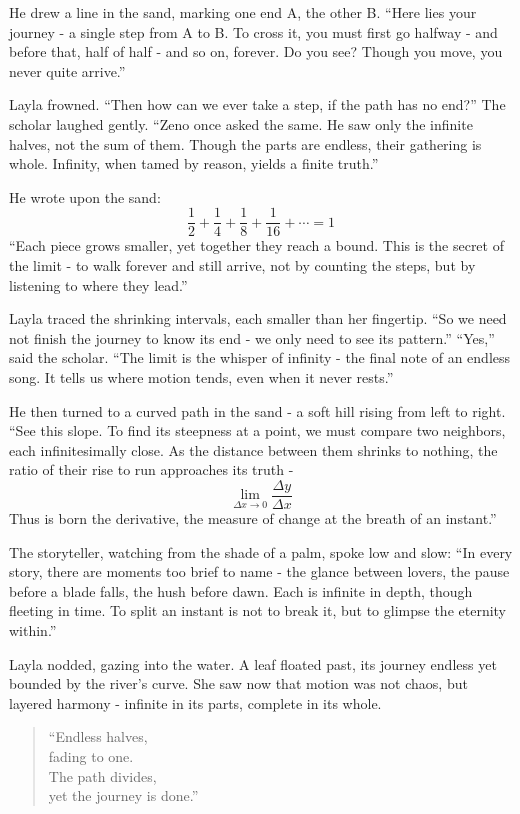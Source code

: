 \documentclass[
  letterpaper,
  DIV=11,
  numbers=noendperiod]{scrreprt}
\begin{document}
He drew a line in the sand, marking one end A, the other B. ``Here lies
your journey - a single step from A to B. To cross it, you must first go
halfway - and before that, half of half - and so on, forever. Do you
see? Though you move, you never quite arrive.''

Layla frowned. ``Then how can we ever take a step, if the path has no
end?'' The scholar laughed gently. ``Zeno once asked the same. He saw
only the infinite halves, not the sum of them. Though the parts are
endless, their gathering is whole. Infinity, when tamed by reason,
yields a finite truth.''

He wrote upon the sand: \[
\frac{1}{2} + \frac{1}{4} + \frac{1}{8} + \frac{1}{16} + \cdots = 1
\] ``Each piece grows smaller, yet together they reach a bound. This is
the secret of the limit - to walk forever and still arrive, not by
counting the steps, but by listening to where they lead.''

Layla traced the shrinking intervals, each smaller than her fingertip.
``So we need not finish the journey to know its end - we only need to
see its pattern.'' ``Yes,'' said the scholar. ``The limit is the whisper
of infinity - the final note of an endless song. It tells us where
motion tends, even when it never rests.''

He then turned to a curved path in the sand - a soft hill rising from
left to right. ``See this slope. To find its steepness at a point, we
must compare two neighbors, each infinitesimally close. As the distance
between them shrinks to nothing, the ratio of their rise to run
approaches its truth - \[
\lim_{\Delta x \to 0} \frac{\Delta y}{\Delta x}
\] Thus is born the derivative, the measure of change at the breath of
an instant.''

The storyteller, watching from the shade of a palm, spoke low and slow:
``In every story, there are moments too brief to name - the glance
between lovers, the pause before a blade falls, the hush before dawn.
Each is infinite in depth, though fleeting in time. To split an instant
is not to break it, but to glimpse the eternity within.''

Layla nodded, gazing into the water. A leaf floated past, its journey
endless yet bounded by the river's curve. She saw now that motion was
not chaos, but layered harmony - infinite in its parts, complete in its
whole.

\begin{quote}
``Endless halves,\\
fading to one.\\
The path divides,\\
yet the journey is done.''
\end{quote}
\end{document}
